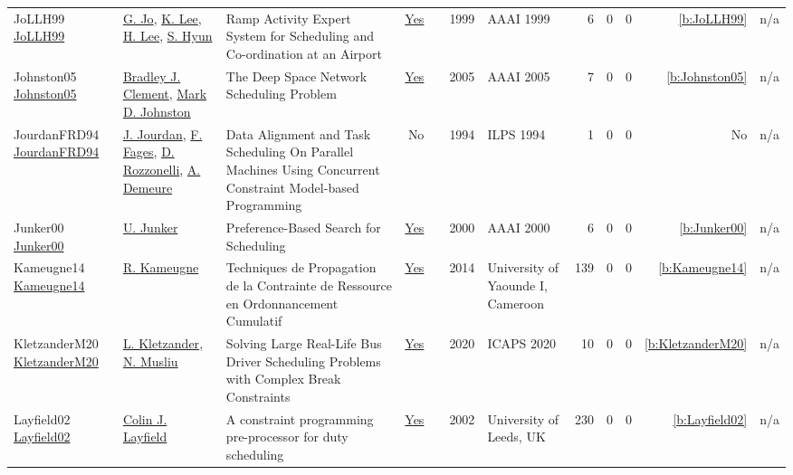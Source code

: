 {\begin{longtable}{>{\raggedright\arraybackslash}p{3cm}>{\raggedright\arraybackslash}p{6cm}>{\raggedright\arraybackslash}p{6.5cm}rrrp{2.5cm}rrrrr}
JoLLH99 \href{http://www.aaai.org/Library/IAAI/1999/iaai99-114.php}{JoLLH99} & \hyperref[auth:a1342]{G. Jo}, \hyperref[auth:a1343]{K. Lee}, \hyperref[auth:a1344]{H. Lee}, \hyperref[auth:a1345]{S. Hyun} & Ramp Activity Expert System for Scheduling and Co-ordination at an Airport & \href{../works/JoLLH99.pdf}{Yes} & \cite{JoLLH99} & 1999 & AAAI 1999 & 6 & 0 & 0 & \ref{b:JoLLH99} & n/a\\
Johnston05 \href{}{Johnston05} & \hyperref[auth:a1366]{Bradley J. Clement}, \hyperref[auth:a1231]{Mark D. Johnston} & The Deep Space Network Scheduling Problem & \href{../works/Johnston05.pdf}{Yes} & \cite{Johnston05} & 2005 & AAAI 2005 & 7 & 0 & 0 & \ref{b:Johnston05} & n/a\\
JourdanFRD94 \href{}{JourdanFRD94} & \hyperref[auth:a703]{J. Jourdan}, \hyperref[auth:a704]{F. Fages}, \hyperref[auth:a705]{D. Rozzonelli}, \hyperref[auth:a706]{A. Demeure} & Data Alignment and Task Scheduling On Parallel Machines Using Concurrent Constraint Model-based Programming & No & \cite{JourdanFRD94} & 1994 & ILPS 1994 & 1 & 0 & 0 & No & n/a\\
Junker00 \href{http://www.aaai.org/Library/AAAI/2000/aaai00-139.php}{Junker00} & \hyperref[auth:a1350]{U. Junker} & Preference-Based Search for Scheduling & \href{../works/Junker00.pdf}{Yes} & \cite{Junker00} & 2000 & AAAI 2000 & 6 & 0 & 0 & \ref{b:Junker00} & n/a\\
Kameugne14 \href{http://cp2013.a4cp.org/sites/default/files/roger_kameugne_-_propagation_techniques_of_resource_constraint_for_cumulative_scheduling.pdf}{Kameugne14} & \hyperref[auth:a10]{R. Kameugne} & Techniques de Propagation de la Contrainte de Ressource en Ordonnancement Cumulatif & \href{../works/Kameugne14.pdf}{Yes} & \cite{Kameugne14} & 2014 & University of Yaounde I, Cameroon & 139 & 0 & 0 & \ref{b:Kameugne14} & n/a\\
KletzanderM20 \href{https://ojs.aaai.org/index.php/ICAPS/article/view/6688}{KletzanderM20} & \hyperref[auth:a78]{L. Kletzander}, \hyperref[auth:a45]{N. Musliu} & Solving Large Real-Life Bus Driver Scheduling Problems with Complex Break Constraints & \href{../works/KletzanderM20.pdf}{Yes} & \cite{KletzanderM20} & 2020 & ICAPS 2020 & 10 & 0 & 0 & \ref{b:KletzanderM20} & n/a\\
Layfield02 \href{http://etheses.whiterose.ac.uk/1301/}{Layfield02} & \hyperref[auth:a676]{Colin J. Layfield} & A constraint programming pre-processor for duty scheduling & \href{../works/Layfield02.pdf}{Yes} & \cite{Layfield02} & 2002 & University of Leeds, {UK} & 230 & 0 & 0 & \ref{b:Layfield02} & n/a\\

\end{longtable}}
